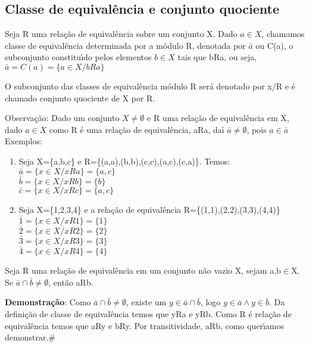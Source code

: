 \subsection{Classe de equival{\^e}ncia e conjunto quociente}
\begin{definicao} Seja R uma rela{\c c}{\~a}o de equival{\^e}ncia sobre um conjunto X. Dado $a\in X$, chamamos classe de equival{\^e}ncia determinada por a m{\'o}dulo R, denotada por $\bar{a}$ ou C(a), o subconjunto constitu{\'\i}do pelos elementos $b\in X$ tais que bRa, ou seja, $\bar{a}=C(a)=\{a\in X/ bRa\}$\end{definicao}

\begin{definicao} O subconjunto das classes de equival{\^e}ncia m{\'o}dulo R ser{\'a} denotado por x/R e {\'e} chamado conjunto quociente de X por R.\end{definicao}

Observa{\c c}{\~a}o: Dado um conjunto $X\neq\emptyset$ e R uma rela{\c c}{\~a}o de equival{\^e}ncia em X, dado $a\in X$ como R {\'e} uma rela{\c c}{\~a}o de equival{\^e}ncia, aRa, da{\'\i} $\bar{a}\neq\emptyset$, pois $a\in\bar{a}$\\

Exemplos:
\begin{enumerate}
\item Seja X=\{a,b,c\} e R=\{(a,a),(b,b),(c,c),(a,c),(c,a)\}. Temos:\\
$\bar{a}=\{x\in X/xRa\}=\{a,c\}$\\
$\bar{b}=\{x\in X/xRb\}=\{b\}$\\
$\bar{c}=\{x\in X/xRc\}=\{a,c\}$
\item Seja X=\{1,2,3,4\} e a rela{\c c}{\~a}o de equival{\^e}ncia R=\{(1,1),(2,2),(3,3),(4,4)\}\\
$\bar{1}=\{x\in X/xR1\}=\{1\}$\\
$\bar{2}=\{x\in X/xR2\}=\{2\}$\\
$\bar{3}=\{x\in X/xR3\}=\{3\}$\\
$\bar{4}=\{x\in X/xR4\}=\{4\}$
\end{enumerate}

\begin{proposicao} Seja R uma rela{\c c}{\~a}o de equival{\^e}ncia em um conjunto n{\~a}o vazio X, sejam a,b$\in$X. Se $\bar{a}\cap\bar{b}\neq\emptyset$, ent{\~a}o aRb.\end{proposicao}

\textbf{Demonstra{\c c}{\~a}o}: Como  $\bar{a}\cap\bar{b}\neq\emptyset$, existe um $y\in\bar{a}\cap\bar{b}$, logo $y\in\bar{a}\wedge y\in\bar{b}$. Da defini{\c c}{\~a}o de classe de equival{\^e}ncia temos que yRa e yRb. Como R {\'e} rela{\c c}{\~a}o de equival{\^e}ncia temos que aRy e bRy. Por transitividade, aRb, como quer{\'\i}amos demonstrar.\#

